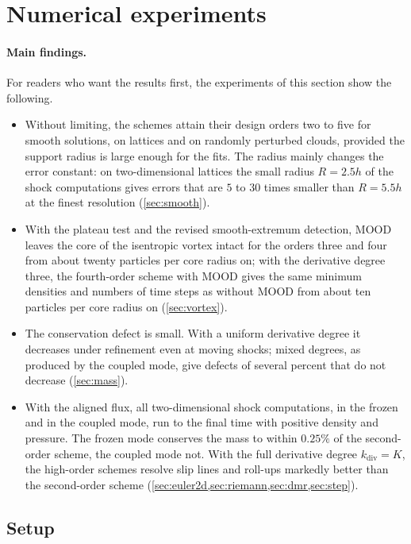 \documentclass[11pt,a4paper]{article}
\numberwithin{equation}{section}
\begin{document}
\section{Numerical experiments}\label{sec:experiments}

\paragraph{Main findings.} For readers who want the results first, the experiments of this section show the following.
\begin{itemize}
\item Without limiting, the schemes attain their design orders two to five for smooth solutions, on lattices and on randomly perturbed clouds, provided the support radius is large enough for the fits. The radius mainly changes the error constant: on two-dimensional lattices the small radius $R=2.5h$ of the shock computations gives errors that are $5$ to $30$ times smaller than $R=5.5h$ at the finest resolution (\cref{sec:smooth}).
\item With the plateau test and the revised smooth-extremum detection, MOOD leaves the core of the isentropic vortex intact for the orders three and four from about twenty particles per core radius on; with the derivative degree three, the fourth-order scheme with MOOD gives the same minimum densities and numbers of time steps as without MOOD from about ten particles per core radius on (\cref{sec:vortex}).
\item The conservation defect is small. With a uniform derivative degree it decreases under refinement even at moving shocks; mixed degrees, as produced by the coupled mode, give defects of several percent that do not decrease (\cref{sec:mass}).
\item With the aligned flux, all two-dimensional shock computations, in the frozen and in the coupled mode, run to the final time with positive density and pressure. The frozen mode conserves the mass to within $0.25\%$ of the second-order scheme, the coupled mode not. With the full derivative degree $k_{\mathrm{div}}=K$, the high-order schemes resolve slip lines and roll-ups markedly better than the second-order scheme (\cref{sec:euler2d,sec:riemann,sec:dmr,sec:step}).
\end{itemize}

\subsection{Setup}\label{sec:setup}
\end{document}
